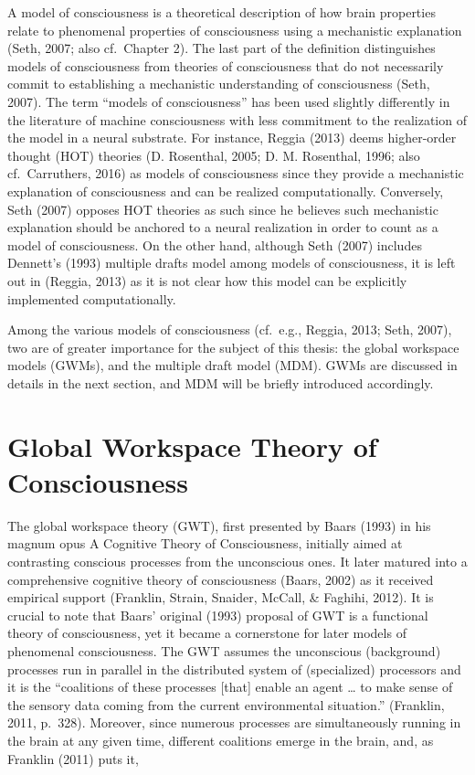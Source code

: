 \documentclass[12pt,twoside]{reedthesis}
\begin{document}
A model of consciousness is a theoretical description of how brain properties relate to phenomenal properties of consciousness using a mechanistic explanation (Seth, 2007; also cf.~Chapter 2). The last part of the definition distinguishes models of consciousness from theories of consciousness that do not necessarily commit to establishing a mechanistic understanding of consciousness (Seth, 2007). The term ``models of consciousness'' has been used slightly differently in the literature of machine consciousness with less commitment to the realization of the model in a neural substrate. For instance, Reggia (2013) deems higher-order thought (HOT) theories (D. Rosenthal, 2005; D. M. Rosenthal, 1996; also cf.~Carruthers, 2016) as models of consciousness since they provide a mechanistic explanation of consciousness and can be realized computationally. Conversely, Seth (2007) opposes HOT theories as such since he believes such mechanistic explanation should be anchored to a neural realization in order to count as a model of consciousness. On the other hand, although Seth (2007) includes Dennett's (1993) multiple drafts model among models of consciousness, it is left out in (Reggia, 2013) as it is not clear how this model can be explicitly implemented computationally.

Among the various models of consciousness (cf.~e.g., Reggia, 2013; Seth, 2007), two are of greater importance for the subject of this thesis: the global workspace models (GWMs), and the multiple draft model (MDM). GWMs are discussed in details in the next section, and MDM will be briefly introduced accordingly.

\hypertarget{global-workspace-theory-of-consciousness}{%
\section{Global Workspace Theory of Consciousness}\label{global-workspace-theory-of-consciousness}}

The global workspace theory (GWT), first presented by Baars (1993) in his magnum opus A Cognitive Theory of Consciousness, initially aimed at contrasting conscious processes from the unconscious ones. It later matured into a comprehensive cognitive theory of consciousness (Baars, 2002) as it received empirical support (Franklin, Strain, Snaider, McCall, \& Faghihi, 2012). It is crucial to note that Baars' original (1993) proposal of GWT is a functional theory of consciousness, yet it became a cornerstone for later models of phenomenal consciousness. The GWT assumes the unconscious (background) processes run in parallel in the distributed system of (specialized) processors and it is the ``coalitions of these processes {[}that{]} enable an agent \ldots{} to make sense of the sensory data coming from the current environmental situation.'' (Franklin, 2011, p.~328). Moreover, since numerous processes are simultaneously running in the brain at any given time, different coalitions emerge in the brain, and, as Franklin (2011) puts it,
\end{document}
